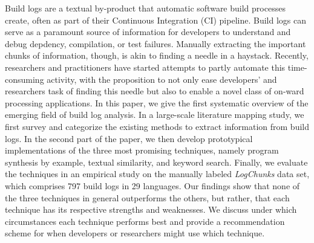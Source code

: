 Build logs are a textual by-product that automatic software build processes
create, often as part of their Continuous Integration (CI)
pipeline.
Build logs can serve as a paramount source of
information for developers to understand and debug depdency, compilation, or
test failures.
Manually
extracting the important chunks of information, though, is akin to
finding a needle in a haystack.
Recently, researchers and practitioners have started attempts to partly
automate
this time-consuming activity, with the proposition to not only ease
developers' and researchers task of finding this needle but also to enable a novel class of
on-ward processing applications.
In this paper, we give the first systematic overview of the emerging field of build log analysis.
In a large-scale literature mapping study, we first survey and categorize the existing methods to
extract information from build logs.
In the second part of the paper, we then develop prototypical implementations of the three most promising
techniques, namely program synthesis
by example, textual similarity, and keyword search.
Finally, we evaluate the techniques in an empirical study on
the manually
labeled \emph{LogChunks} data set, which comprises 797 build logs in
29 languages.
Our findings show that none of the three techniques in general outperforms
the others, but rather, that each technique has its respective strengths
and weaknesses.
We discuss under which circumstances each technique performs best
and provide a recommendation scheme for when developers or researchers might 
use which technique.
